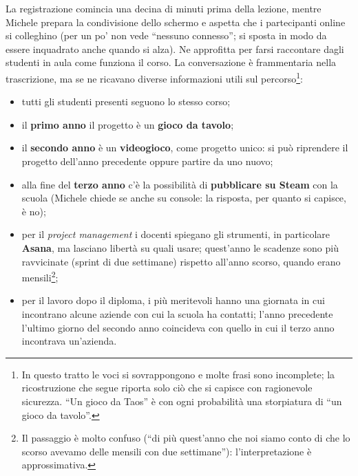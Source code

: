La registrazione comincia una decina di minuti prima della lezione, mentre
Michele prepara la condivisione dello schermo e aspetta che i partecipanti
online si colleghino (per un po' non vede ``nessuno connesso''; si sposta in
modo da essere inquadrato anche quando si alza). Ne approfitta per farsi
raccontare dagli studenti in aula come funziona il corso. La conversazione è
frammentaria nella trascrizione, ma se ne ricavano diverse informazioni utili
sul percorso\footnote{In questo tratto le voci si sovrappongono e molte frasi
sono incomplete; la ricostruzione che segue riporta solo ciò che si capisce con
ragionevole sicurezza. ``Un gioco da Taos'' è con ogni probabilità una
storpiatura di ``un gioco da tavolo''.}:
\begin{itemize}
  \item tutti gli studenti presenti seguono lo stesso corso;
  \item il \textbf{primo anno} il progetto è un \textbf{gioco da tavolo};
  \item il \textbf{secondo anno} è un \textbf{videogioco}, come progetto unico:
        si può riprendere il progetto dell'anno precedente oppure partire da
        uno nuovo;
  \item alla fine del \textbf{terzo anno} c'è la possibilità di
        \textbf{pubblicare su Steam} con la scuola (Michele chiede se anche su
        console: la risposta, per quanto si capisce, è no);
  \item per il \emph{project management} i docenti spiegano gli strumenti, in
        particolare \textbf{Asana}, ma lasciano libertà su quali usare;
        quest'anno le scadenze sono più ravvicinate (sprint di due settimane)
        rispetto all'anno scorso, quando erano mensili\footnote{Il passaggio è
        molto confuso (``di più quest'anno che noi siamo conto di che lo scorso
        avevamo delle mensili con due settimane''): l'interpretazione è
        approssimativa.};
  \item per il lavoro dopo il diploma, i più meritevoli hanno una giornata in
        cui incontrano alcune aziende con cui la scuola ha contatti; l'anno
        precedente l'ultimo giorno del secondo anno coincideva con quello in
        cui il terzo anno incontrava un'azienda.
\end{itemize}

